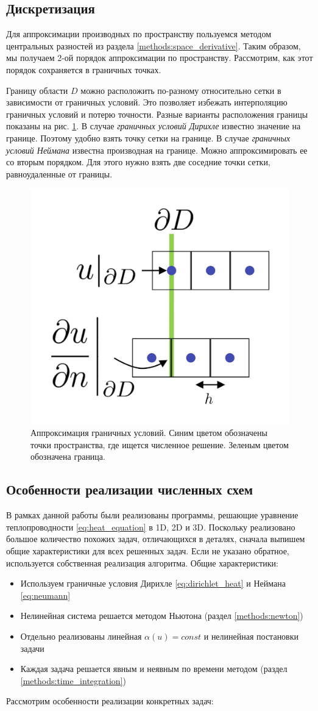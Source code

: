 \subsection{Дискретизация}
Для аппроксимации производных по пространству пользуемся методом центральных разностей из раздела \ref{methods:space_derivative}. Таким образом, мы получаем 2-ой порядок аппроксимации по пространству. Рассмотрим, как этот порядок сохраняется в граничных точках.
\par
Границу области $D$ можно расположить по-разному относительно сетки в зависимости от граничных условий. Это позволяет избежать интерполяцию граничных условий и потерю точности. Разные варианты расположения границы показаны на рис. \ref{fig:heat_bound}. В случае \textit{граничных условий Дирихле} известно значение на границе. Поэтому удобно взять точку сетки на границе. В случае \textit{граничных условий Неймана} известна производная на границе. Можно аппроксимировать ее со вторым порядком. Для этого нужно взять две соседние точки сетки, равноудаленные от границы. 
\begin{figure}[H]
\centering
\includegraphics[width=.4\textwidth]{common_images/dirichlet_neumann.jpg}
\caption{Аппроксимация граничных условий. Синим цветом обозначены точки пространства, где ищется численное решение. Зеленым цветом обозначена граница.}
\label{fig:heat_bound}
\end{figure}
\subsection{Особенности реализации численных схем}
В рамках данной работы были реализованы программы, решающие уравнение теплопроводности \eqref{eq:heat_equation} в 1D, 2D и 3D. Поскольку реализовано большое количество похожих задач, отличающихся в деталях, сначала выпишем общие характеристики для всех решенных задач. Если не указано обратное, используется собственная реализация алгоритма.
Общие характеристики:
\begin{itemize}
\item Используем граничные условия Дирихле \eqref{eq:dirichlet_heat} и Неймана \eqref{eq:neumann}
\item Нелинейная система решается методом Ньютона (раздел \ref{methods:newton})
\item Отдельно реализованы линейная $\alpha(u) = const$ и нелинейная постановки задачи
\item Каждая задача решается явным и неявным по времени методом (раздел \ref{methods:time_integration})
\end{itemize}
Рассмотрим особенности реализации конкретных задач:
